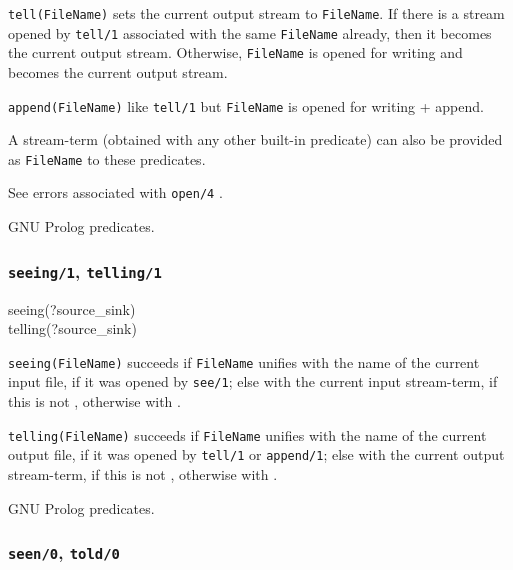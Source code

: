 \texttt{tell(FileName)} sets the current output stream to \texttt{FileName}.
If there is a stream opened by \texttt{tell/1} associated with the same
\texttt{FileName} already, then it becomes the current output stream.
Otherwise, \texttt{FileName} is opened for writing and becomes the current
output stream.

\texttt{append(FileName)} like \texttt{tell/1} but
\texttt{FileName} is opened for writing + append.

A stream-term (obtained with any other built-in predicate) can also be
provided as \texttt{FileName} to these predicates.

\Errors

See errors associated with \texttt{open/4} .

\Portability

GNU Prolog predicates.

\subsubsection{\texttt{seeing/1},
               \texttt{telling/1}}

\begin{TemplatesOneCol}
seeing(?source\_sink)\\
telling(?source\_sink)

\end{TemplatesOneCol}

\Description

\texttt{seeing(FileName)} succeeds if \texttt{FileName} unifies
with the name of the current input file, if it was opened by
\texttt{see/1}; else with the current input stream-term, if this is not
, otherwise with
. 

\texttt{telling(FileName)} succeeds if \texttt{FileName} unifies with the
name of the current output file, if it was opened by \texttt{tell/1} or
\texttt{append/1}; else with the current output stream-term, if this is not
, otherwise with . 

\PlErrorsNone

\Portability

GNU Prolog predicates.

\subsubsection{\texttt{seen/0},
               \texttt{told/0}}


